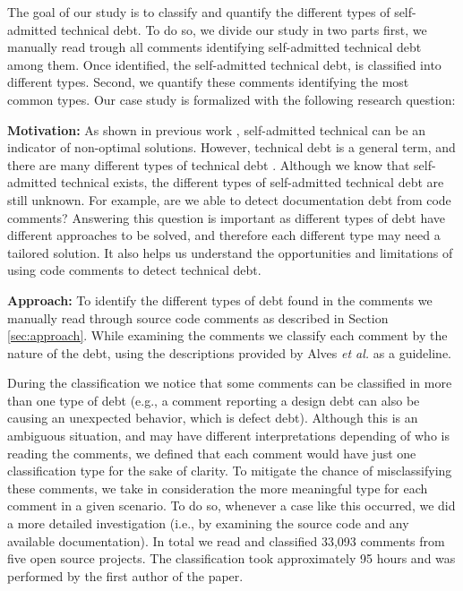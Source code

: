 The goal of our study is to classify and quantify the different types of self-admitted technical debt. To do so, we divide our study in two parts first, we manually read trough all comments identifying self-admitted technical debt among them. Once identified, the self-admitted technical debt, is classified into different types. Second, we quantify these comments identifying the most common types. Our case study is formalized with the following research question:



\vspace{3mm}
\noindent\rqi
\vspace{3mm}

\noindent\textbf{Motivation:} As shown in previous work \cite{Potdar2014ICSME}, self-admitted technical can be an indicator of non-optimal solutions. However, technical debt is a general term, and there are many different types of technical debt \cite{Alves2014MTD}. Although we know that self-admitted technical exists, the different types of self-admitted technical debt are still unknown. For example, are we able to detect documentation debt from code comments? Answering this question is important as different types of debt have different approaches to be solved, and therefore each different type may need a tailored solution. It also helps us understand the opportunities and limitations of using code comments to detect technical debt. 

\vspace{1mm}
\noindent\textbf{Approach:} To identify the different types of debt found in the comments we manually read through source code comments as described in Section \ref{sec:approach}. While examining the comments we classify each comment by the nature of the debt, using the descriptions provided by Alves \textit{et al.} as a guideline. 

During the classification we notice that some comments can be classified in more than one type of debt (e.g., a comment reporting a design debt can also be causing an unexpected behavior, which is defect debt). Although this is an ambiguous situation, and may have different interpretations depending of who is reading the comments, we defined that each comment would have just one classification type for the sake of clarity. To mitigate the chance of misclassifying these comments, we take in consideration the more meaningful type for each comment in a given scenario. To do so, whenever a case like this occurred, we did a more detailed investigation (i.e., by examining the source code and any available documentation). In total we read and classified 33,093 comments from five open source projects. The classification took approximately 95 hours and was performed by the first author of the paper. 

